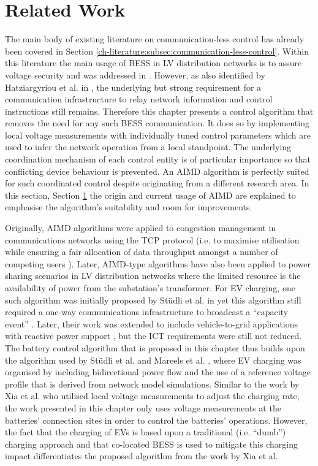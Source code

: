 \section{Related Work}
\label{ch4:sec:related-work}

The main body of existing literature on communication-less control has already been covered in Section \ref{ch-literature:subsec:communication-less-control}.
Within this literature the main usage of BESS in LV distribution networks is to assure voltage security and was addressed in \cite{Sugihara2013, Toledo2013, Marra2013, Mokhtari2013, Atia2016}.
However, as also identified by Hatziargyriou et al. in \cite{Hatziargyriou2015}, the underlying but strong requirement for a communication infrastructure to relay network information and control instructions still remains.
Therefore this chapter presents a control algorithm that removes the need for any such BESS communication.
It does so by implementing local voltage measurements with individually tuned control parameters which are used to infer the network operation from a local standpoint.
The underlying coordination mechanism of each control entity is of particular importance so that conflicting device behaviour is prevented.
An AIMD algorithm is perfectly suited for such coordinated control despite originating from a different research area.
In this section, Section \ref{ch4:sec:related-work} the origin and current usage of AIMD are explained to emphasise the algorithm's suitability and room for improvements.

Originally, AIMD algorithms were applied to congestion management in communications networks using the TCP protocol \cite{Chiu1989} (i.e. to maximise utilisation while ensuring a fair allocation of data throughput amongst a number of competing users \cite{Wirth2014}).
Later, AIMD-type algorithms have also been applied to power sharing scenarios in LV distribution networks where the limited resource is the availability of power from the substation's transformer.
For EV charging, one such algorithm was initially proposed by St{\"{u}}dli et al. in \cite{Studli2012} yet this algorithm still required a one-way communications infrastructure to broadcast a ``capacity event'' \cite{Studli2014, Studli2014a}.
Later, their work was extended to include vehicle-to-grid applications with reactive power support \cite {Studli2015}, but the ICT requirements were still not reduced.
The battery control algorithm that is proposed in this chapter thus builds upon the algorithm used by St{\"{u}}dli et al. and Mareels et al. \cite{Mareels2014}, where EV charging was organised by including bidirectional power flow and the use of a reference voltage profile that is derived from network model simulations.
Similar to the work by Xia et al. \cite{Xia2014} who utilised local voltage measurements to adjust the charging rate, the work presented in this chapter only uses voltage measurements at the batteries' connection sites in order to control the batteries' operations.
However, the fact that the charging of EVs is based upon a traditional (i.e. ``dumb'') charging approach and that co-located BESS is used to mitigate this charging impact differentiates the proposed algorithm from the work by Xia et al.

